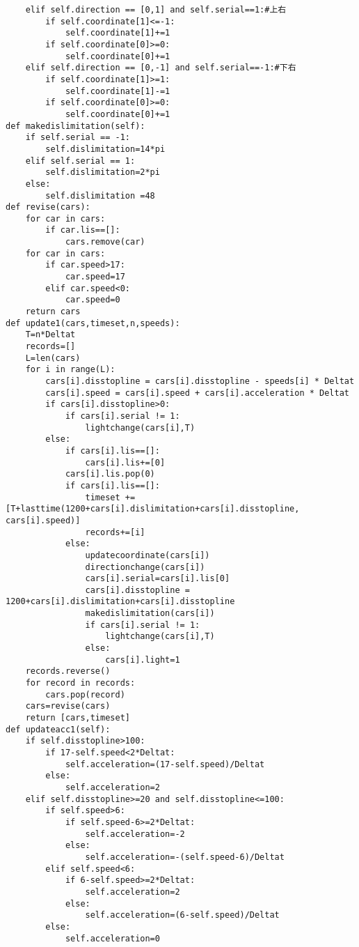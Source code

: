 \documentclass[a4paper,12pt]{article}
\numberwithin{equation}{section}
\begin{document}
\begin{appendix}
\begin{lstlisting}
    elif self.direction == [0,1] and self.serial==1:#上右
        if self.coordinate[1]<=-1:
            self.coordinate[1]+=1
        if self.coordinate[0]>=0:
            self.coordinate[0]+=1
    elif self.direction == [0,-1] and self.serial==-1:#下右
        if self.coordinate[1]>=1:
            self.coordinate[1]-=1
        if self.coordinate[0]>=0:
            self.coordinate[0]+=1
def makedislimitation(self):
    if self.serial == -1:
        self.dislimitation=14*pi
    elif self.serial == 1:
        self.dislimitation=2*pi
    else:
        self.dislimitation =48
def revise(cars):
    for car in cars:
        if car.lis==[]:
            cars.remove(car)
    for car in cars:
        if car.speed>17:
            car.speed=17
        elif car.speed<0:
            car.speed=0
    return cars
def update1(cars,timeset,n,speeds):
    T=n*Deltat
    records=[]
    L=len(cars)
    for i in range(L):
        cars[i].disstopline = cars[i].disstopline - speeds[i] * Deltat
        cars[i].speed = cars[i].speed + cars[i].acceleration * Deltat
        if cars[i].disstopline>0:
            if cars[i].serial != 1:
                lightchange(cars[i],T)
        else:
            if cars[i].lis==[]:
                cars[i].lis+=[0]
            cars[i].lis.pop(0)
            if cars[i].lis==[]:
                timeset +=[T+lasttime(1200+cars[i].dislimitation+cars[i].disstopline, cars[i].speed)]
                records+=[i]
            else:
                updatecoordinate(cars[i])
                directionchange(cars[i])
                cars[i].serial=cars[i].lis[0]
                cars[i].disstopline = 1200+cars[i].dislimitation+cars[i].disstopline
                makedislimitation(cars[i])
                if cars[i].serial != 1:
                    lightchange(cars[i],T)
                else:
                    cars[i].light=1
    records.reverse()
    for record in records:
        cars.pop(record)
    cars=revise(cars)
    return [cars,timeset]
def updateacc1(self):
    if self.disstopline>100:
        if 17-self.speed<2*Deltat:
            self.acceleration=(17-self.speed)/Deltat
        else:
            self.acceleration=2
    elif self.disstopline>=20 and self.disstopline<=100:
        if self.speed>6:
            if self.speed-6>=2*Deltat:
                self.acceleration=-2
            else:
                self.acceleration=-(self.speed-6)/Deltat
        elif self.speed<6:
            if 6-self.speed>=2*Deltat:
                self.acceleration=2
            else:
                self.acceleration=(6-self.speed)/Deltat
        else:
            self.acceleration=0

\end{lstlisting}
\end{appendix}
\end{document}
